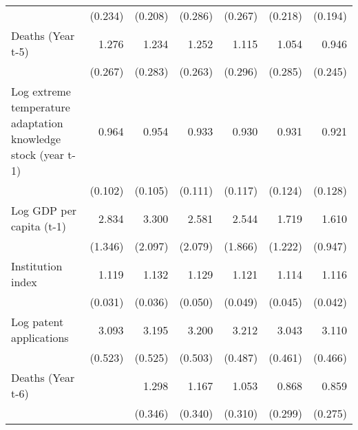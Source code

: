 \begin{table}[htbp]
\begin{tabular}{l*{6}{D{.}{.}{-1}}}
                    &     (0.234)         &     (0.208)         &     (0.286)         &     (0.267)         &     (0.218)         &     (0.194)         \\
\addlinespace
Deaths (Year t-5)   &       1.276         &       1.234         &       1.252         &       1.115         &       1.054         &       0.946         \\
                    &     (0.267)         &     (0.283)         &     (0.263)         &     (0.296)         &     (0.285)         &     (0.245)         \\
\addlinespace
Log extreme temperature adaptation knowledge stock (year t-1)&       0.964         &       0.954         &       0.933         &       0.930         &       0.931         &       0.921         \\
                    &     (0.102)         &     (0.105)         &     (0.111)         &     (0.117)         &     (0.124)         &     (0.128)         \\
\addlinespace
Log GDP per capita (t-1)&       2.834\sym{**} &       3.300\sym{*}  &       2.581         &       2.544         &       1.719         &       1.610         \\
                    &     (1.346)         &     (2.097)         &     (2.079)         &     (1.866)         &     (1.222)         &     (0.947)         \\
\addlinespace
Institution index   &       1.119\sym{***}&       1.132\sym{***}&       1.129\sym{***}&       1.121\sym{***}&       1.114\sym{***}&       1.116\sym{***}\\
                    &     (0.031)         &     (0.036)         &     (0.050)         &     (0.049)         &     (0.045)         &     (0.042)         \\
\addlinespace
Log patent applications&       3.093\sym{***}&       3.195\sym{***}&       3.200\sym{***}&       3.212\sym{***}&       3.043\sym{***}&       3.110\sym{***}\\
                    &     (0.523)         &     (0.525)         &     (0.503)         &     (0.487)         &     (0.461)         &     (0.466)         \\
\addlinespace
Deaths (Year t-6)   &                     &       1.298         &       1.167         &       1.053         &       0.868         &       0.859         \\
                    &                     &     (0.346)         &     (0.340)         &     (0.310)         &     (0.299)         &     (0.275)         \\

\end{tabular}
\end{table}
